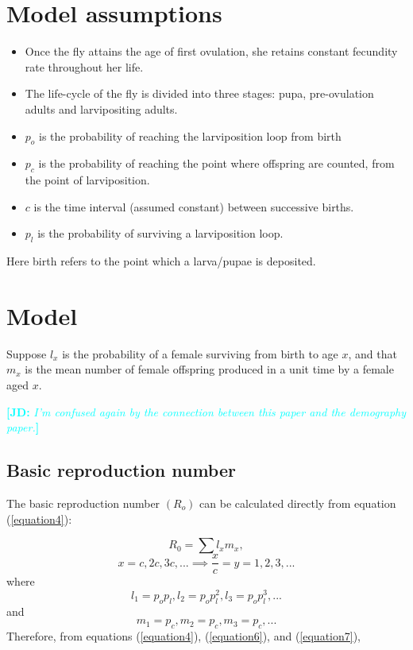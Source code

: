 \documentclass[12pt,a4paper]{article}
\newcommand{\comment}[3]{\textcolor{#1}{\textbf{[#2: }\textsl{#3}\textbf{]}}}
\newcommand{\jd}[1]{\comment{cyan}{JD}{#1}}
\begin{document}
\section*{Model assumptions} 
\begin{itemize} 
	\item  Once the fly attains the age of first ovulation, she retains constant fecundity rate throughout her life.   
	\item The life-cycle of the fly is divided into three stages: pupa, pre-ovulation adults and larvipositing adults. 
	\item  $p_o$ is the probability of reaching the larviposition loop from birth
	\item   $p_c$ is the probability of reaching the point where offspring are counted, from the point of larviposition.
	\item   $c$ is the time interval (assumed constant) between successive births. 
	\item   $p_l$ is the probability of surviving a larviposition loop.
\end{itemize}
Here birth refers to the point which a larva/pupae is deposited. 

\section*{Model} 

Suppose  $l_{x}$ is the probability of a female surviving from birth to age $x$, and that $m_{x}$ is the mean number of female offspring produced in a unit time by a female aged $x$.  

\jd{I'm confused again by the connection between this paper and the demography paper.}

\subsection*{Basic reproduction number}

The basic reproduction number $(R_o)$ can be calculated directly from equation (\ref{equation4}): 

$$R_{0 }=\sum l_{x}m_{x},$$
$$x=c,2c,3c,... \implies \frac{x}{c}=y = 1,2,3,...$$ 
where
\begin{equation}
\label{equation6} 
l_{1}=p_op_l, l_{2}= p_op_l^2, l_{3}=p_op_l^3, . . .
\end{equation}
and
\begin{equation}
\label{equation7} 
m_{1}=p_c, m_{2}=p_c, m_{3}=p_c, . . .
\end{equation}
Therefore, from equations (\ref{equation4}),  (\ref{equation6}), and  (\ref{equation7}),
\end{document}
